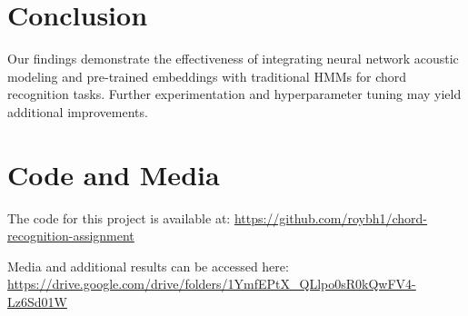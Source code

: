 \documentclass{article}
\begin{document}
\section{Conclusion}
Our findings demonstrate the effectiveness of integrating neural network acoustic modeling and pre-trained embeddings with traditional HMMs for chord recognition tasks. Further experimentation and hyperparameter tuning may yield additional improvements.

\section*{Code and Media}
The code for this project is available at: \url{https://github.com/roybh1/chord-recognition-assignment}

Media and additional results can be accessed here: \url{https://drive.google.com/drive/folders/1YmfEPtX_QLlpo0sR0kQwFV4-Lz6Sd01W}
\end{document}
